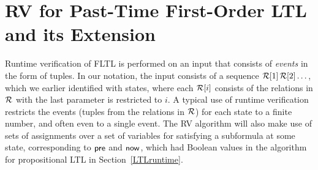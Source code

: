 
\section{RV for Past-Time
First-Order  LTL and its Extension}
\label{EPLTLRV}

Runtime verification of FLTL is performed on an
input that consists of {\em events} in the form of
tuples. In our notation, the input
consists of a sequence ${\cal R}[1] \, {\cal R}[2]  \ldots$,
which we earlier identified with states, where each
${\cal R}[i]$ consists of the relations in
${\cal R}$ with
the last parameter is restricted to  $i$. A typical use
of runtime verification restricts the
events (tuples from the relations in ${\cal R}$) for
each state to a finite number, and often even to a single event.
The RV algorithm will also make
use of sets of assignments over a set of variables for satisfying a subformula at
some state, corresponding to $\mathsf{pre}$ and $\mathsf{now}$, which had Boolean values in the 
algorithm for propositional LTL in Section~\ref{LTLruntime}.




